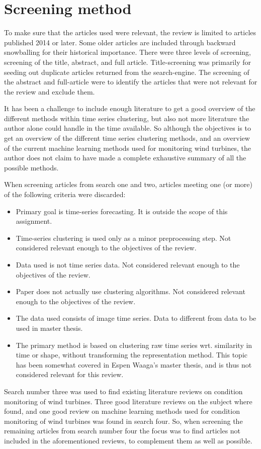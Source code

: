 \section{Screening method}
To make sure that the articles used were relevant, the review is limited to articles published 2014 or later. Some older articles are included through backward snowballing for their historical importance. There were three levels of screening, screening of the title, abstract, and full article. Title-screening was primarily for seeding out duplicate articles returned from the search-engine. The screening of the abstract and full-article were to identify the articles that were not relevant for the review and exclude them. \bigskip

It has been a challenge to include enough literature to get a good overview of the different methods within time series clustering, but also not more literature the author alone could handle in the time available. So although the objectives is to get an overview of the different time series clustering methods, and an overview of the current machine learning methods used for monitoring wind turbines, the author does not claim to have made a complete exhaustive summary of all the possible methods. \bigskip

When screening articles from search one and two, articles meeting one (or more) of the following criteria were discarded: 
\begin{itemize}
    \item Primary goal is time-series forecasting. It is outside the scope of this assignment.
    \item Time-series clustering is used only as a minor preprocessing step. Not considered relevant enough to the objectives of the review.
    \item Data used is not time series data. Not considered relevant enough to the objectives of the review.
    \item Paper does not actually use clustering algorithms. Not considered relevant enough to the objectives of the review.
    \item The data used consists of image time series. Data to different from data to be used in master thesis.
    \item The primary method is based on clustering raw time series wrt. similarity in time or shape, without transforming the representation method. This topic has been somewhat covered in Espen Waaga's master thesis, and is thus not considered relevant for this review.
\end{itemize}

Search number three was used to find existing literature reviews on condition monitoring of wind turbines. Three good literature reviews on the subject where found, and one good review on machine learning methods used for condition monitoring of wind turbines was found in search four. So, when screening the remaining articles from search number four the focus was to find articles not included in the aforementioned reviews, to complement them as well as possible. \bigskip